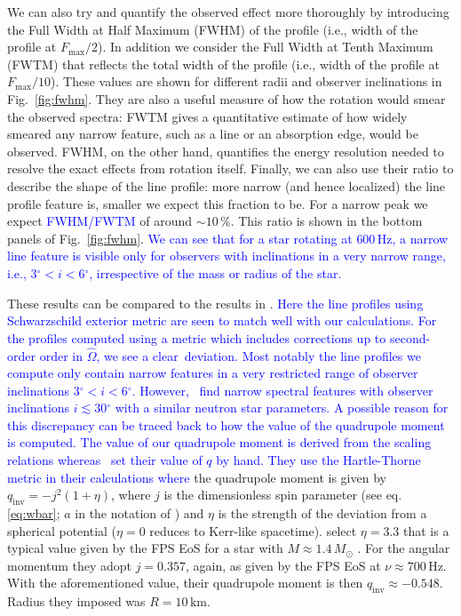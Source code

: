 \documentclass{aa}
\newcommand{\refe}[1]{\textcolor{blue}{{#1}}}
\newcommand{\sch}{Schwarzschild }
\newcommand{\Ob}{\ensuremath{\hat{\Omega}}}
\newcommand{\Msun}{\ensuremath{M_{\odot}}}
\newcommand{\qinv}{\ensuremath{q_{\mathrm{inv}}}}
\renewcommand{\deg}{\ensuremath{^{\circ}}}
\begin{document}
We can also try and quantify the observed effect more thoroughly by introducing the Full Width at Half Maximum (FWHM) of the profile (i.e., width of the profile at $F_{\mathrm{max}}/2$).
In addition we consider the Full Width at Tenth Maximum (FWTM) that reflects the total width of the profile (i.e., width of the profile at $F_{\mathrm{max}}/10$).
These values are shown for different radii and observer inclinations in Fig.~\ref{fig:fwhm}.
They are also a useful measure of how the rotation would smear the observed spectra:
FWTM gives a quantitative estimate of how widely smeared any narrow feature, such as a line or an absorption edge, would be observed.
FWHM, on the other hand, quantifies the energy resolution needed to resolve the exact effects from rotation itself.
Finally, we can also use their ratio to describe the shape of the line profile:
more narrow (and hence localized) the line profile feature is, smaller we expect this fraction to be.
For a narrow peak we expect \refe{FWHM/FWTM} of around $\sim 10\,\%$.
This ratio is shown in the bottom panels of Fig.~\ref{fig:fwhm}.
\refe{We can see that for a star rotating at $600\,\mathrm{Hz}$, a narrow line feature is visible only for observers with inclinations in a very narrow range, i.e., $3\deg  < i < 6\deg$, irrespective of the mass or radius of the star.}


These results can be compared to the results in \citet{BPO13}. 
\refe{Here the line profiles using \sch exterior metric are seen to match well with our calculations.}
\refe{For the profiles computed using a metric which includes corrections up to second-order order in $\Ob$, we see a clear deviation.}
\refe{Most notably the line profiles we compute only contain narrow features in a very restricted range of observer inclinations $3\deg  < i < 6\deg$.}
\refe{However, \citet{BPO13} find narrow spectral features with observer inclinations $i \lesssim 30\deg$ with a similar neutron star parameters.}
\refe{A possible reason for this discrepancy can be traced back to how the value of the quadrupole moment is computed.}
\refe{The value of our quadrupole moment is derived from the scaling relations whereas \citet{BPO13} set their value of $q$ by hand.}
\refe{They use the Hartle-Thorne metric \citep{HT68} in their calculations where} the quadrupole moment is given by $\qinv = -j^2 (1 + \eta)$, where $j$ is the dimensionless spin parameter (see eq. \eqref{eq:wbar}; $a$ in the notation of \citealt{BPO13}) and $\eta$ is the strength of the deviation from a spherical potential ($\eta = 0$ reduces to Kerr-like spacetime).
\citet{BPO13} select $\eta=3.3$ that is a typical value given by the FPS EoS \citep{FPS} for a star with $M\approx1.4\,\Msun$ \citep[see][]{LP99}.
For the angular momentum they adopt $j = 0.357$, again, as given by the FPS EoS at $\nu \approx 700\,\mathrm{Hz}$.
With the aforementioned value, their quadrupole moment is then $\qinv \approx -0.548$.
Radius they imposed was $R = 10\,\mathrm{km}$.
\end{document}
